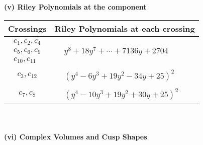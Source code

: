 \documentclass[1p]{elsarticle_modified}
\theoremstyle{definition}
\begin{document}
\newpage\renewcommand{\arraystretch}{1}
\flushleft \textbf{(v) Riley Polynomials at the component}\newline \\
\begin{tabular}{m{50pt}|m{274pt}}
Crossings & \hspace{64pt}Riley Polynomials at each crossing \\
\hline $$\begin{aligned}c_{1},c_{2},c_{4}\\c_{5},c_{6},c_{9}\\c_{10},c_{11}\end{aligned}$$&$\begin{aligned}
&y^8+18 y^7+\cdots+7136 y+2704
\end{aligned}$\\
\hline $$\begin{aligned}c_{3},c_{12}\end{aligned}$$&$\begin{aligned}
&(y^4-6 y^3+19 y^2-34 y+25)^2
\end{aligned}$\\
\hline $$\begin{aligned}c_{7},c_{8}\end{aligned}$$&$\begin{aligned}
&(y^4-10 y^3+19 y^2+30 y+25)^2
\end{aligned}$\\
\hline
\end{tabular}\\~\\
\newpage\flushleft \textbf{(vi) Complex Volumes and Cusp Shapes}
\end{document}
